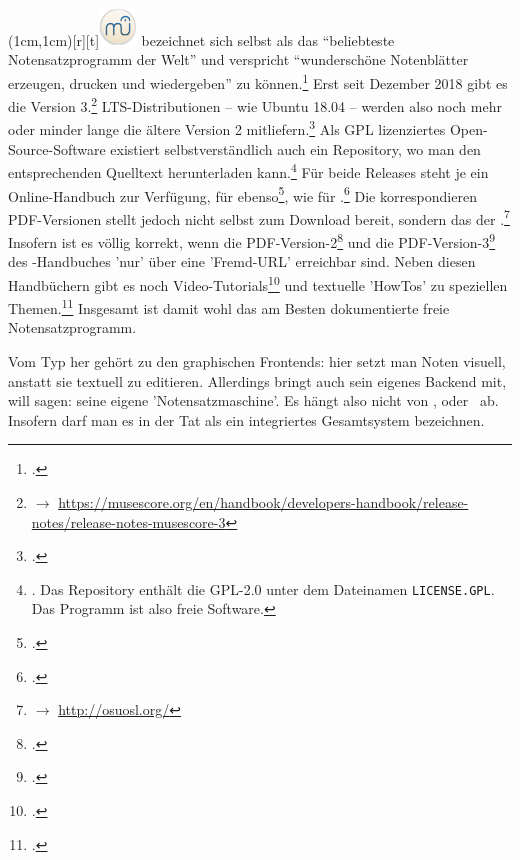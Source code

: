 \parpic(1cm,1cm)[r][t]{\includegraphics[width=1cm]{logos/musescore-300dpi.png}}
\label{MuseScore} bezeichnet sich selbst als das
\enquote{beliebteste Notensatzprogramm der Welt} und verspricht
\enquote{wunderschöne Notenblätter erzeugen, drucken und wiedergeben} zu
können.\footcite[vgl.][\nopage wp]{MuseScore2019a} Erst seit Dezember 2018 gibt
es die Version 3.\footnote{$\rightarrow$
\href{https://musescore.org/en/handbook/developers-handbook/release-notes/release-notes-musescore-3}
{https://musescore.org/en/handbook/developers-handbook/release-notes/release-notes-musescore-3}}
LTS-Distributionen -- wie Ubuntu 18.04 -- werden also noch mehr oder minder
lange die ältere Version 2 mitliefern.\footcite[vgl.][\nopage
wp]{UbuntuMuseScore2018a} Als GPL lizenziertes Open-Source-Software existiert
selbstverständlich auch ein Repository, wo man den entsprechenden Quelltext
herunterladen kann.\footnote{\cite[vgl.][\nopage wp]{GithubMuseScore2019a}. Das
Repository enthält die GPL-2.0 unter dem Dateinamen \texttt{LICENSE.GPL}. Das
Programm ist also freie Software.} Für beide Releases steht je ein
Online-Handbuch zur Verfügung, für 
ebenso\footcite[vgl.][\nopage wp]{MuseScore2019c}, wie für
.\footcite[vgl.][\nopage wp]{MuseScore2019d} Die korrespondieren
PDF-Versionen stellt jedoch nicht  selbst zum Download bereit,
sondern das  der .\footnote{
$\rightarrow$ \href{http://osuosl.org/}{http://osuosl.org/}} Insofern ist es
völlig korrekt, wenn die PDF-Version-2\footcite[vgl.][\nopage
wp]{MuseScore2019h} und die PDF-Version-3\footcite[vgl.][\nopage
wp]{MuseScore2019g} des -Handbuches 'nur' über eine 'Fremd-URL'
erreichbar sind. Neben diesen Handbüchern gibt es noch
Video-Tutorials\footcite[vgl.][\nopage wp]{MuseScore2019e} und textuelle
'HowTos' zu speziellen Themen.\footcite[vgl.][\nopage wp]{MuseScore2019f}
Insgesamt ist  damit wohl das am Besten dokumentierte freie
Notensatzprogramm.

Vom Typ her gehört  zu den graphischen Frontends:
hier setzt man Noten visuell, anstatt sie textuell zu editieren. Allerdings
bringt  auch sein eigenes Backend mit, will sagen: seine eigene
'Notensatzmaschine'. Es hängt also nicht von ,  oder
\ ab. Insofern darf man es in der Tat als ein integriertes
Gesamtsystem bezeichnen.

